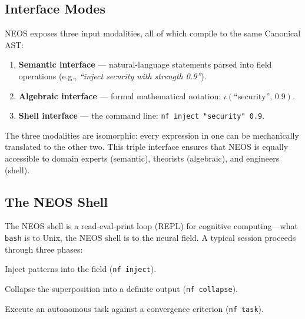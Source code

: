 \subsection{Interface Modes}\label{sec:interfaces}

NEOS exposes three input modalities, all of which compile to the same
Canonical AST:

\begin{enumerate}[nosep]
  \item \textbf{Semantic interface} --- natural-language statements
        parsed into field operations
        (e.g., \emph{``inject security with strength 0.9''}).
  \item \textbf{Algebraic interface} --- formal mathematical notation:
        $\iota(\text{``security''},\, 0.9)$.
  \item \textbf{Shell interface} --- the command line:
        \texttt{nf inject "security" 0.9}.
\end{enumerate}

\noindent
The three modalities are isomorphic: every expression in one can be
mechanically translated to the other two.  This triple interface ensures
that NEOS is equally accessible to domain experts (semantic), theorists
(algebraic), and engineers (shell).

\subsection{The NEOS Shell}\label{sec:shell}

The NEOS shell is a read-eval-print loop (REPL) for cognitive
computing---what \texttt{bash} is to Unix, the NEOS shell is to the
neural field.  A typical session proceeds through three phases:

\begin{description}[nosep, leftmargin=2em, labelwidth=1.8em, style=nextline]
  \item[\textnormal{\textsc{Create}}]
    Inject patterns into the field
    (\texttt{nf inject}).
  \item[\textnormal{\textsc{Compile}}]
    Collapse the superposition into a definite output
    (\texttt{nf collapse}).
  \item[\textnormal{\textsc{Run}}]
    Execute an autonomous task against a convergence criterion
    (\texttt{nf task}).
\end{description}

